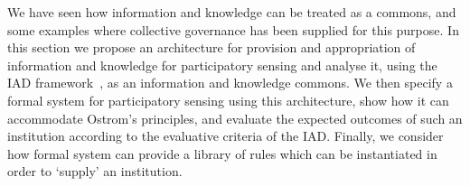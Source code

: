 




We have seen how information and knowledge can be treated as a commons, and some examples where collective governance has been supplied for this purpose. 
In this section we propose an architecture for provision and appropriation of information and knowledge for participatory sensing and analyse it, using the \ac{IAD} framework~\citep{Ostrom2005}, as an information and knowledge commons.
We then specify a formal system for participatory sensing using this architecture, show how it can accommodate Ostrom's principles,
and evaluate the expected outcomes of such an institution according to the evaluative criteria of the \ac{IAD}.
Finally, we consider how formal system can provide a library of rules which can be instantiated in order to `supply' an institution. 


